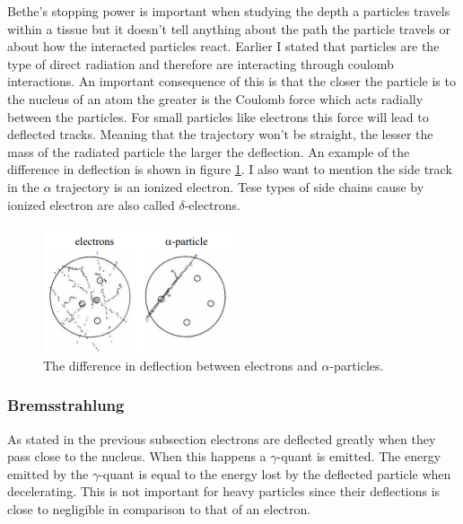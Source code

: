 \documentclass[jmp, amsmath, amssymb, reprint]{article}
\numberwithin{equation}{section}
\begin{document}
\begin{multicols}{2}
Bethe's stopping power is important when studying the depth a particles travels within a tissue but it doesn't tell anything about the path the particle travels or about how the interacted particles react. Earlier I stated that particles are the type of direct radiation and therefore are interacting through coulomb interactions. An important consequence of this is that the closer the particle is to the nucleus of an atom the greater is the Coulomb force which acts radially between the particles. For small particles like electrons this force will lead to deflected tracks. Meaning that the trajectory won't be straight, the lesser the mass of the radiated particle the larger the deflection. An example of the difference in deflection is shown in figure \ref{fig:scattering}. I also want to mention the side track in the \(\alpha\) trajectory is an ionized electron. Tese types of side chains cause by ionized electron are also called \(\delta\)-electrons.

\begin{figure}[H]
	\centering
  	\includegraphics[width=0.50\textwidth]{scattering.png}
	\caption{The difference in deflection between electrons and \(\alpha\)-particles.}
	\label{fig:scattering}
\end{figure}

\subsubsection{Bremsstrahlung}

As stated in the previous subsection electrons are deflected greatly when they pass close to the nucleus. When this happens a \(\gamma\)-quant is emitted. The energy emitted by the \(\gamma\)-quant is equal to the energy lost by the deflected particle when decelerating. This is not important for heavy particles since their deflections is close to negligible in comparison to that of an electron.


\end{multicols}

\end{document}
